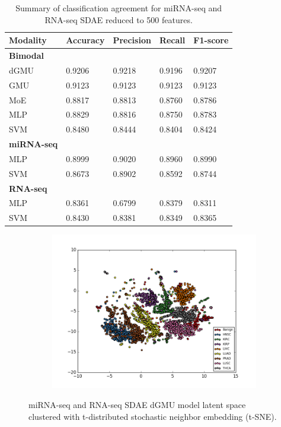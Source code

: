 \begin{table}[H]
   \caption{Summary of classification agreement for miRNA-seq and RNA-seq SDAE reduced to 500 features.} 
   \small %
   \centering %
   \begin{tabular}{lllll} %
   \toprule[\heavyrulewidth]\toprule[\heavyrulewidth]
   \textbf{Modality} & \textbf{Accuracy} & \textbf{Precision} & \textbf{Recall} & \textbf{F1-score} \\ 
   \midrule
   \multicolumn{1}{l}{\textbf{Bimodal}} \\
        dGMU & 0.9206 &	0.9218 & 0.9196	& 0.9207\\
        GMU  & 0.9123 &	0.9123 & 0.9123 & 0.9123\\
        MoE  & 0.8817 &	0.8813 & 0.8760 & 0.8786\\
        MLP  & 0.8829 &	0.8816 & 0.8750 & 0.8783\\
        SVM  & 0.8480 &	0.8444 & 0.8404 & 0.8424\\
   \midrule
   \multicolumn{1}{l}{\textbf{miRNA-seq}} \\
        MLP  & 0.8999 &	0.9020 & 0.8960 & 0.8990\\
        SVM  & 0.8673 &	0.8902 & 0.8592 & 0.8744\\
   \midrule
   \multicolumn{1}{l}{\textbf{RNA-seq}}  \\
        MLP  & 0.8361 &	0.6799 & 0.8379 & 0.8311\\
        SVM  & 0.8430 &	0.8381 & 0.8349 & 0.8365\\
   \bottomrule[\heavyrulewidth] 
   \end{tabular}
   \label{table:m_r_sdae_exp41}
\end{table}

\begin{figure}[H]
     \centering
     \begin{subfigure}[b]{\textwidth}
         \centering
         \includegraphics[width=\textwidth]{img/m_r/m_r_sdae_tsne.png}
     \end{subfigure}
        \caption{miRNA-seq and RNA-seq SDAE dGMU model latent space clustered with t-distributed stochastic neighbor embedding (t-SNE).}
        \label{fig:r_m_sdae_tsne}
\end{figure}

